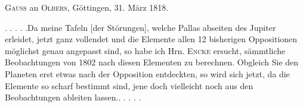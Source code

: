 \par{}\bigskip
\begin{center}
\textsc{Gauss} an \textsc{Olbers}, Göttingen, 31. März 1818.
\end{center}
\noindent\hspace*{\parindent}. . . . .\quad Da meine Tafeln [der Störungen], welche Pallas abseiten des Jupiter erleidet, jetzt ganz vollendet und die Elemente allen 12 bisherigen Oppositionen möglichst genau angepasst sind, so habe ich Hrn. \textsc{Encke} ersucht, sämmtliche Beobachtungen von 1802 nach diesen Elementen zu berechnen. Obgleich Sie den Planeten erst etwas nach der Opposition entdeckten, so wird sich jetzt, da die Elemente so scharf bestimmt sind, jene doch vielleicht noch aus den Beobachtungen ableiten lassen.\quad . . . . .
\par
